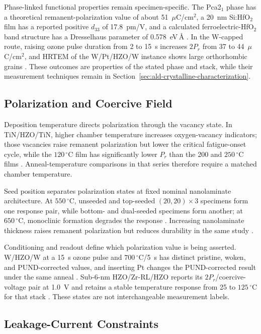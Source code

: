 \documentclass[11pt,a4paper]{report}
\begin{document}
Phase-linked functional properties remain specimen-specific. The Pca2$_1$ phase has a theoretical remanent-polarization value of about 51~$\mu$C/cm$^2$, a 20~nm Si:HfO$_2$ film has a reported positive $d_{33}$ of 17.8~pm/V, and a calculated ferroelectric-HfO$_2$ band structure has a Dresselhaus parameter of 0.578~eV\,\AA{} \cite{silva2023road,liao2023postmoore}. In the W-capped route, raising ozone pulse duration from 2 to 15~s increases $2P_r$ from 37 to 44~$\mu$C/cm$^2$, and HRTEM of the W/Pt/HZO/W instance shows large orthorhombic grains \cite{kashir2021wake}. These outcomes are properties of the stated phase and stack, while their measurement techniques remain in Section~\ref{sec:ald-crystalline-characterization}.

\subsection{Polarization and Coercive Field}
\label{sec:ald-polarization}

Deposition temperature directs polarization through the vacancy state. In TiN/HZO/TiN, higher chamber temperature increases oxygen-vacancy indicators; those vacancies raise remanent polarization but lower the critical fatigue-onset cycle, while the $120\,^{\circ}$C film has significantly lower $P_r$ than the 200 and $250\,^{\circ}$C films \cite{choi2022chamber}. Anneal-temperature comparisons in that series therefore require a matched chamber temperature.

Seed position separates polarization states at fixed nominal nanolaminate architecture. At $550\,^{\circ}$C, unseeded and top-seeded $(20,20)\times3$ specimens form one response pair, while bottom- and dual-seeded specimens form another; at $650\,^{\circ}$C, monoclinic formation degrades the response \cite{song2023seed}. Increasing nanolaminate thickness raises remanent polarization but reduces durability in the same study \cite{song2023seed}.

Conditioning and readout define which polarization value is being asserted. W/HZO/W at a 15~s ozone pulse and $700\,^{\circ}$C/5~s has distinct pristine, woken, and PUND-corrected values, and inserting Pt changes the PUND-corrected result under the same anneal \cite{kashir2021wake}. Sub-6-nm HZO/Zr-RL/HZO reports its $2P_r$/coercive-voltage pair at 1.0~V and retains a stable temperature response from 25 to $125\,^{\circ}$C for that stack \cite{liu2025zrrich}. These states are not interchangeable measurement labels.
\subsection{Leakage-Current Constraints}
\label{sec:ald-leakage}
\end{document}
